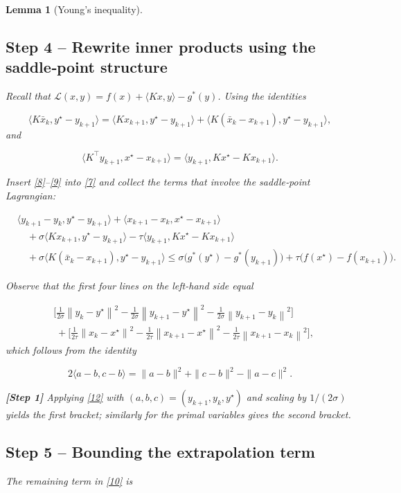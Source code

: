 \documentclass{article}
\newtheorem{lemma}{Lemma}
\newcommand{\ip}[2]{\langle #1,#2\rangle}
\newcommand{\norm}[1]{\left\|#1\right\|}
\begin{document}
\begin{lemma}[Young’s inequality]
\subsection*{Step 4 – Rewrite inner products using the saddle‑point structure}
Recall that $\mathcal L(x,y)=f(x)+\langle Kx,y\rangle-g^{*}(y)$.  Using the identities  

\[
\ip{K\bar x_{k}}{y^{\star}-y_{k+1}}=
\ip{Kx_{k+1}}{y^{\star}-y_{k+1}}
+\ip{K(\bar x_{k}-x_{k+1})}{y^{\star}-y_{k+1}},
\tag{8}
\]
and  

\[
\ip{K^{\top}y_{k+1}}{x^{\star}-x_{k+1}}
=\ip{y_{k+1}}{Kx^{\star}-Kx_{k+1}} .
\tag{9}
\]

Insert \eqref{8}–\eqref{9} into \eqref{7} and collect the terms that involve the saddle‑point Lagrangian:

\[
\begin{aligned}
&\ip{y_{k+1}-y_{k}}{y^{\star}-y_{k+1}}
+\ip{x_{k+1}-x_{k}}{x^{\star}-x_{k+1}}\\
&\quad+\sigma\ip{Kx_{k+1}}{y^{\star}-y_{k+1}}
-\tau\ip{y_{k+1}}{Kx^{\star}-Kx_{k+1}}
\\
&\quad+\sigma\ip{K(\bar x_{k}-x_{k+1})}{y^{\star}-y_{k+1}}
\le
\sigma\bigl(g^{*}(y^{\star})-g^{*}(y_{k+1})\bigr)
+\tau\bigl(f(x^{\star})-f(x_{k+1})\bigr).
\end{aligned}
\tag{10}
\]

Observe that the first four lines on the left-hand side equal  

\[
\begin{aligned}
&\bigl[\tfrac{1}{2\sigma}\norm{y_{k}-y^{\star}}^{2}
      -\tfrac{1}{2\sigma}\norm{y_{k+1}-y^{\star}}^{2}
      -\tfrac{1}{2\sigma}\norm{y_{k+1}-y_{k}}^{2}\bigr]\\
&\;+\bigl[\tfrac{1}{2\tau}\norm{x_{k}-x^{\star}}^{2}
      -\tfrac{1}{2\tau}\norm{x_{k+1}-x^{\star}}^{2}
      -\tfrac{1}{2\tau}\norm{x_{k+1}-x_{k}}^{2}\bigr],
\end{aligned}
\tag{11}
\]
which follows from the identity  

\[
2\langle a-b,c-b\rangle=\|a-b\|^{2}+\|c-b\|^{2}-\|a-c\|^{2}.
\tag{12}
\]

\textbf{[Step 1]} Applying \eqref{12} with $(a,b,c)=(y_{k+1},y_{k},y^{\star})$ and scaling by $1/(2\sigma)$ yields the first bracket; similarly for the primal variables gives the second bracket.

\subsection*{Step 5 – Bounding the extrapolation term}
The remaining term in \eqref{10} is  


\end{lemma}
\end{document}
